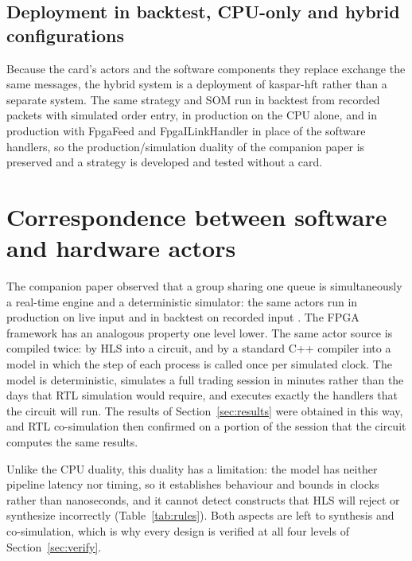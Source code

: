 \documentclass[11pt]{article}
\begin{document}
\subsection{Deployment in backtest, CPU-only and hybrid configurations}

Because the card's actors and the software components they replace exchange
the same messages, the hybrid system is a deployment of kaspar-hft rather than a
separate system. The same strategy and SOM run in backtest from recorded
packets with simulated order entry, in production on the CPU alone, and in
production with FpgaFeed and FpgaILinkHandler in place of the software
handlers, so the production/simulation duality of the companion paper
\cite{fastsend} is preserved and a strategy is developed and tested without a
card.

\section{Correspondence between software and hardware actors}
\label{sec:duality}

The companion paper observed that a group sharing one queue is simultaneously a
real-time engine and a deterministic simulator: the same actors run in
production on live input and in backtest on recorded input \cite{fastsend}. The
FPGA framework has an analogous property one level lower. The same actor source
is compiled twice: by HLS into a circuit, and by a standard C++ compiler into a
model in which the step of each process is called once per simulated clock. The
model is deterministic, simulates a full trading session in minutes rather than
the days that RTL simulation would require, and executes exactly the handlers
that the circuit will run. The results of Section~\ref{sec:results} were
obtained in this way, and RTL co-simulation then confirmed on a portion of the
session that the circuit computes the same results.

Unlike the CPU duality, this duality has a limitation: the model has neither
pipeline latency nor timing, so it establishes behaviour and bounds in clocks
rather than nanoseconds, and it cannot detect constructs that HLS will reject
or synthesize incorrectly (Table~\ref{tab:rules}). Both aspects are left to
synthesis and co-simulation, which is why every design is verified at all four
levels of Section~\ref{sec:verify}.

\end{document}
